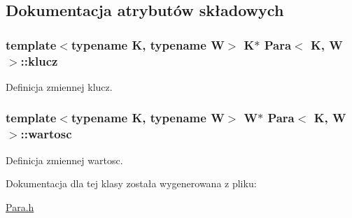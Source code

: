 \subsection{\-Dokumentacja atrybutów składowych}
\hypertarget{class_para_a1cf136d1d7c4c7fca4662a04276d744a}{
\subsubsection[{klucz}]{\setlength{\rightskip}{0pt plus 5cm}template$<$typename \-K, typename \-W$>$ \-K$\ast$ {\bf \-Para}$<$ \-K, \-W $>$\-::{\bf klucz}}}\label{class_para_a1cf136d1d7c4c7fca4662a04276d744a}


\-Definicja zmiennej klucz. 

\hypertarget{class_para_a942bf7c31ea059ed0cfe1ac41bb21d6b}{
\subsubsection[{wartosc}]{\setlength{\rightskip}{0pt plus 5cm}template$<$typename \-K, typename \-W$>$ \-W$\ast$ {\bf \-Para}$<$ \-K, \-W $>$\-::{\bf wartosc}}}\label{class_para_a942bf7c31ea059ed0cfe1ac41bb21d6b}


\-Definicja zmiennej wartosc. 



\-Dokumentacja dla tej klasy została wygenerowana z pliku\-:\begin{DoxyCompactItemize}
\item 
\hyperlink{_para_8h}{\-Para.\-h}\end{DoxyCompactItemize}
